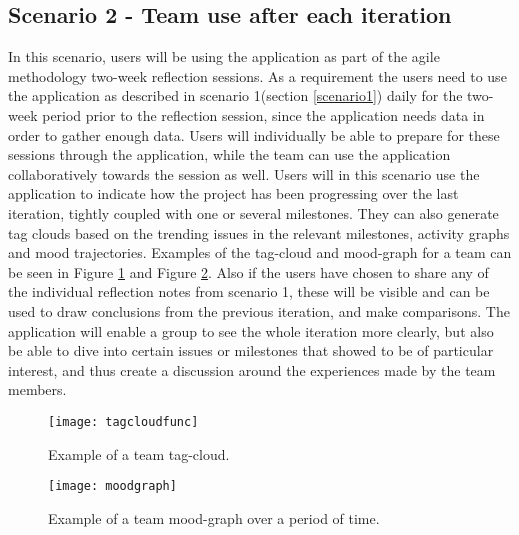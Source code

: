 \subsection{Scenario 2 - Team use after each iteration}
\label{scenario2}
In this scenario, users will be using the application as part of the agile methodology two-week reflection sessions. As a requirement the users need to use the application as described in scenario 1(section \ref{scenario1}) daily for the two-week period prior to the reflection session, since the application needs data in order to gather enough data. Users will individually be able to prepare for these sessions through the application, while the team can use the application collaboratively towards the session as well.
Users will in this scenario use the application to indicate how the project has been progressing over the last iteration, tightly coupled with one or several milestones. They can also generate tag clouds based on the trending issues in the relevant milestones, activity graphs and mood trajectories. Examples of the tag-cloud and mood-graph for a team can be seen in Figure \ref{tagcloudfuncscenario} and Figure \ref{moodgraphscenario}. Also if the users have chosen to share any of the individual reflection notes from scenario 1, these will be visible and can be used to draw conclusions from the previous iteration, and make comparisons. The application will enable a group to see the whole iteration more clearly, but also be able to dive into certain issues or milestones that showed to be of particular interest, and thus create a discussion around the experiences made by the team members.  
\begin{figure}[H]
\centering
	\texttt{[image: tagcloudfunc]}
\caption{Example of a team tag-cloud.}
\label{tagcloudfuncscenario}
\end{figure}
\begin{figure}[H]
\centering
	\texttt{[image: moodgraph]}
\caption{Example of a team mood-graph over a period of time.}
\label{moodgraphscenario}
\end{figure}
